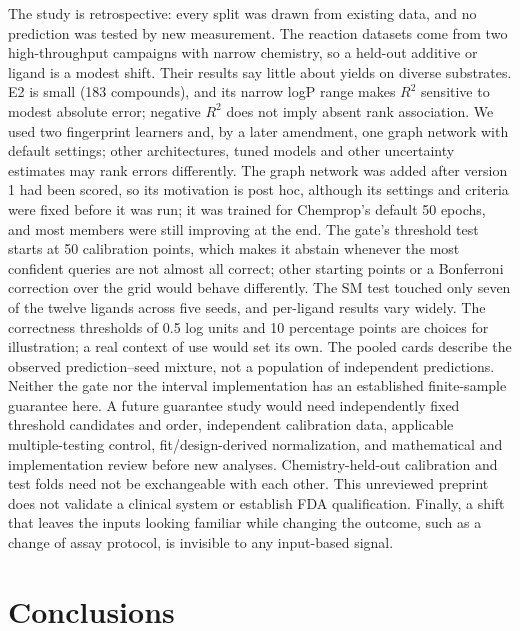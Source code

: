 \documentclass[11pt,letterpaper]{article}
\begin{document}
The study is retrospective: every split was drawn from existing data, and no prediction was tested by new measurement. The reaction datasets come from two high-throughput campaigns with narrow chemistry, so a held-out additive or ligand is a modest shift. Their results say little about yields on diverse substrates. E2 is small (183 compounds), and its narrow logP range makes $R^2$ sensitive to modest absolute error; negative $R^2$ does not imply absent rank association. We used two fingerprint learners and, by a later amendment, one graph network with default settings; other architectures, tuned models and other uncertainty estimates may rank errors differently. The graph network was added after version 1 had been scored, so its motivation is post hoc, although its settings and criteria were fixed before it was run; it was trained for Chemprop's default 50 epochs, and most members were still improving at the end. The gate's threshold test starts at 50 calibration points, which makes it abstain whenever the most confident queries are not almost all correct; other starting points or a Bonferroni correction over the grid would behave differently. The SM test touched only seven of the twelve ligands across five seeds, and per-ligand results vary widely. The correctness thresholds of 0.5 log units and 10 percentage points are choices for illustration; a real context of use would set its own. The pooled cards describe the observed prediction--seed mixture, not a population of independent predictions. Neither the gate nor the interval implementation has an established finite-sample guarantee here. A future guarantee study would need independently fixed threshold candidates and order, independent calibration data, applicable multiple-testing control, fit/design-derived normalization, and mathematical and implementation review before new analyses. Chemistry-held-out calibration and test folds need not be exchangeable with each other. This unreviewed preprint does not validate a clinical system or establish FDA qualification. Finally, a shift that leaves the inputs looking familiar while changing the outcome, such as a change of assay protocol, is invisible to any input-based signal.

\section{Conclusions}
\end{document}
